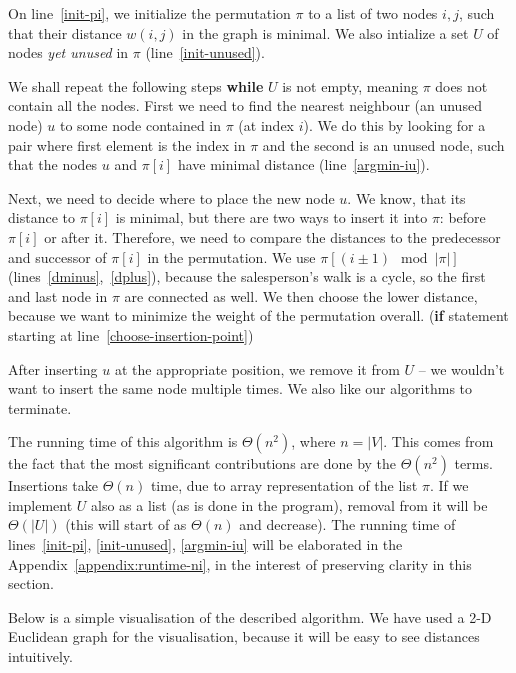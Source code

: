 \documentclass{article}
\newcommand{\bb}[1]{\textbf{#1}}
\newcommand{\ii}[1]{\textit{#1}}
\begin{document}
On line~\ref*{init-pi}, we initialize the permutation $\pi$ to a list of two nodes
$i,j$, such that their distance $w(i,j)$ in the graph is minimal. We also intialize
a set $U$ of nodes \ii{yet unused} in $\pi$ (line~\ref*{init-unused}).

We shall repeat the following steps \bb{while} $U$ is not empty, meaning $\pi$
does not contain all the nodes. First we need to find the nearest neighbour
(an unused node) $u$ to some node contained in $\pi$ (at index $i$). We do this
by looking for a pair where first element is the index in $\pi$ and the second is
an unused node, such that the nodes $u$ and $\pi[i]$ have minimal distance
(line~\ref*{argmin-iu}).

Next, we need to decide where to place the new node $u$. We know, that its distance to
$\pi[i]$ is minimal, but there are two ways to insert it into $\pi$: before $\pi[i]$
or after it. Therefore, we need to compare the distances to the predecessor and
successor of $\pi[i]$ in the permutation. We use $\pi[(i\pm 1)\mod|\pi|]$
(lines~\ref*{dminus},~\ref*{dplus}), because the salesperson's walk is a cycle,
so the first and last node in $\pi$ are connected as well. We then choose the lower
distance, because we want to minimize the weight of the permutation overall.
(\bb{if} statement starting at line~\ref*{choose-insertion-point})

After inserting $u$ at the appropriate position, we remove it from $U$ -- we wouldn't want
to insert the same node multiple times. We also like our algorithms to terminate.

The running time of this algorithm is $\Theta(n^2)$, where $n=|V|$. This comes
from the fact that the most significant contributions are done by the $\Theta(n^2)$
terms. Insertions take $\Theta(n)$ time, due to array representation of the list $\pi$.
If we implement $U$ also as a list (as is done in the program), removal from it
will be $\Theta(|U|)$ (this will start of as $\Theta(n)$ and decrease). The running
time of lines~\ref*{init-pi}, \ref*{init-unused}, \ref*{argmin-iu} will be elaborated
in the Appendix~\ref{appendix:runtime-ni}, in the interest of preserving clarity
in this section.

Below is a simple visualisation of the described algorithm. We have used a 2-D
Euclidean graph for the visualisation, because it will be easy to see distances
intuitively.
\\
\end{document}
